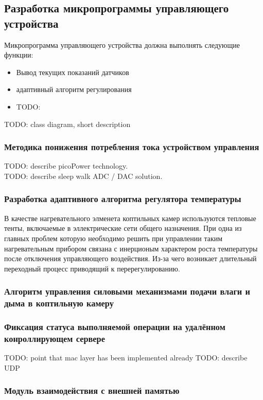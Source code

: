 \subsection{Разработка микропрограммы управляющего устройства}
Микропрограмма управляющего устройства должна выполнять следующие функции:
\begin{itemize}
    \item{} Вывод текущих показаний датчиков
    \item{} адаптивный алгоритм регулирования
    \item{} TODO:
\end{itemize}

TODO: class diagram, short description

\subsubsection{Методика понижения потребления тока устройством управления}
TODO: describe picoPower technology. \\
TODO: describe sleep walk ADC / DAC solution.

\subsubsection{Разработка адаптивного алгоритма регулятора температуры}
В качестве нагревательного элменета коптильных камер используются тепловые тенты,
включаемые в эллектрические сети общего назначения. При одна из главных проблем
которую необходимо решить при управлении таким нагревательным прибором связана
с инерционым характером роста температуры после отключения управляющего воздействия.
Из-за чего возникает длительный переходный процесс приводящий к перерегулированию.

\subsubsection{Алгоритм управления силовыми механизмами подачи влаги и дыма в коптильную камеру}

\subsubsection{Фиксация статуса выполняемой операции на удалённом конроллирующем сервере}
TODO: point that mac layer has been implemented already
TODO: describe UDP \\

\subsubsection{Модуль взаимодействия с внешней памятью}

